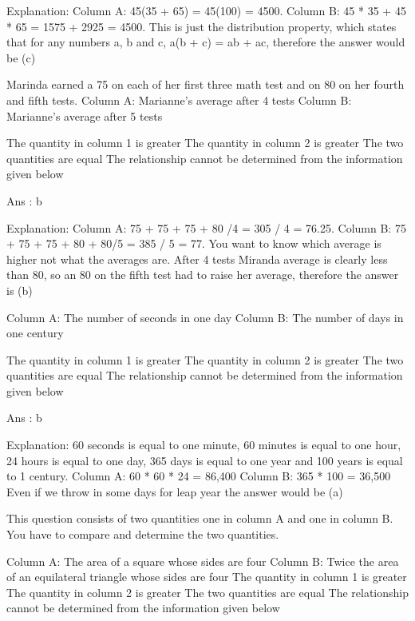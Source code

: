     Explanation:
    Column A: 45(35 + 65) = 45(100) = 4500.
    Column B: 45 * 35 + 45 * 65 = 1575 + 2925 = 4500.
    This is just the distribution property, which states that for any numbers a, b and c, a(b + c) = ab + ac, therefore the answer would be (c)

    Marinda earned a 75 on each of her first three math test and on 80 on her fourth and fifth tests.
    Column A: Marianne’s average after 4 tests
    Column B: Marianne's average after 5 tests

        The quantity in column 1 is greater
        The quantity in column 2 is greater
        The two quantities are equal
        The relationship cannot be determined from the information given below 

    Ans : b

    Explanation:
    Column A: 75 + 75 + 75 + 80 /4 = 305 / 4 = 76.25.
    Column B: 75 + 75 + 75 + 80 + 80/5 = 385 / 5 = 77.
    You want to know which average is higher not what the averages are. After 4 tests Miranda average is clearly less than 80, so an 80 on the fifth test had to raise her average, therefore the answer is (b)

    Column A: The number of seconds in one day
    Column B: The number of days in one century

        The quantity in column 1 is greater
        The quantity in column 2 is greater
        The two quantities are equal
        The relationship cannot be determined from the information given below 

    Ans : b

    Explanation:
    60 seconds is equal to one minute, 60 minutes is equal to one hour, 24 hours is equal to one day, 365 days is equal to one year and 100 years is equal to 1 century.
    Column A: 60 * 60 * 24 = 86,400
    Column B: 365 * 100 = 36,500
    Even if we throw in some days for leap year the answer would be (a) 


This question consists of two quantities one in column A and one in column B. You have to compare and determine the two quantities.

    Column A: The area of a square whose sides are four
    Column B: Twice the area of an equilateral triangle whose sides are four
        The quantity in column 1 is greater
        The quantity in column 2 is greater
        The two quantities are equal
        The relationship cannot be determined from the information given below 

